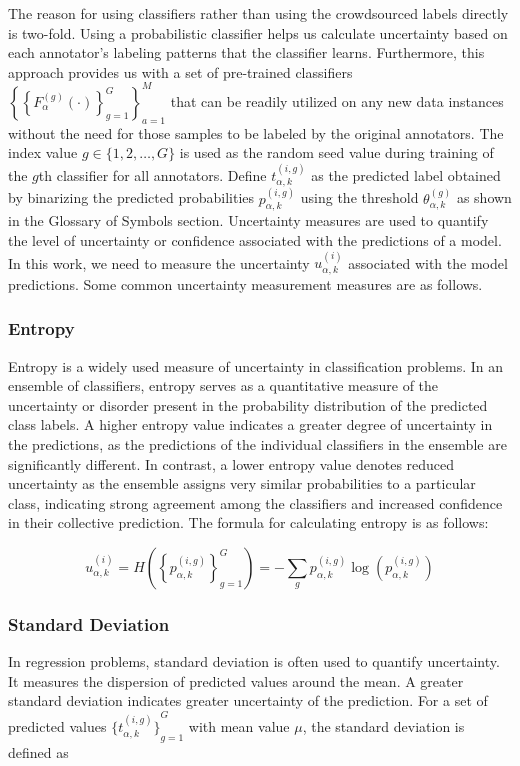 The reason for using classifiers rather than using the crowdsourced labels directly is two-fold. Using a probabilistic classifier helps us calculate uncertainty based on each annotator's labeling patterns that the classifier learns. Furthermore, this approach provides us with a set of pre-trained classifiers ${\left\{ {\left\{ F_{\alpha}^{(g)}(\cdot) \right\}}_{g=1}^G  \right\}}_{a=1}^{M} $ that can be readily utilized on any new data instances without the need for those samples to be labeled by the original annotators.
The index value $g  \in \{1,2,\dots,G\} $ is used as the random seed value during training of the $g$\-th classifier for all annotators.
Define $t_{\alpha,k}^{(i,g)} $ as the predicted label obtained by binarizing the predicted probabilities $p_{\alpha,k}^{ (i,g)} $ using the threshold $\theta_{\alpha,k}^{(g)} $ as shown in the Glossary of Symbols section.
Uncertainty measures are used to quantify the level of uncertainty or confidence associated with the predictions of a model. In this work, we need to measure the uncertainty $u_{\alpha,k}^{(i)}$ associated with the model predictions. Some common uncertainty measurement measures are as follows.

\subsubsection{Entropy}
Entropy is a widely used measure of uncertainty in classification problems. In an ensemble of classifiers, entropy serves as a quantitative measure of the uncertainty or disorder present in the probability distribution of the predicted class labels. A higher entropy value indicates a greater degree of uncertainty in the predictions, as the predictions of the individual classifiers in the ensemble are significantly different. In contrast, a lower entropy value denotes reduced uncertainty as the ensemble assigns very similar probabilities to a particular class, indicating strong agreement among the classifiers and increased confidence in their collective prediction. The formula for calculating entropy is as follows:

\begin{equation}
u_{\alpha,k}^{(i)}=H\left( {\left\{p_{\alpha,k}^{(i,g)}\right\}}_{g=1}^{G}\right)=-\sum_{g}{p_{\alpha,k}^{(i,g)} \log\left(p_{\alpha,k}^{(i,g)}\right)}
\label{eq:crowd.eq.5.uncertainty}
\end{equation}


\subsubsection{Standard Deviation}
In regression problems, standard deviation is often used to quantify uncertainty. It measures the dispersion of predicted values around the mean. A greater standard deviation indicates greater uncertainty of the prediction. For a set of predicted values $ {\{t_{\alpha,k}^{(i,g)} \}}_{g=1}^G $ with mean value $\mu $, the standard deviation is defined as


